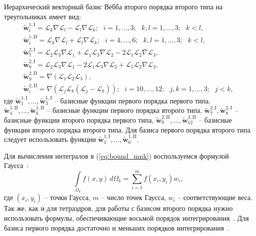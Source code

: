 \documentclass[a4paper,14pt]{article}
\begin{document}
Иерархический векторный базис Вебба второго порядка второго типа на треугольниках имеет вид:
\begin{equation*}
	\begin{matrix}
		\displaystyle
		\tilde{\mathbf{w}}_{i}^{1,\mathrm{I}} = \mathcal{L}_k \nabla \mathcal{L}_l - \mathcal{L}_l \nabla \mathcal{L}_k ;
		\scriptstyle
		\text{~~} i = 1, ..., 3 ; \text{~~} k, l = 1, ..., 3 ; \text{~~} k < l ,\\
		\displaystyle
		\tilde{\mathbf{w}}_{i}^{1,\mathrm{II}} = \mathcal{L}_k \nabla \mathcal{L}_l + \mathcal{L}_l \nabla \mathcal{L}_k ;
		\scriptstyle
		\text{~~} i = 4, ..., 6 ; \text{~~} k, l = 1, ..., 3 ; \text{~~} k < l ,\\
		\displaystyle
		\tilde{\mathbf{w}}_{7}^{2,\mathrm{I}} = \mathcal{L}_2 \mathcal{L}_3 \nabla \mathcal{L}_1 + \mathcal{L}_1 \mathcal{L}_3 \nabla \mathcal{L}_2 - 2 \mathcal{L}_1 \mathcal{L}_2 \nabla \mathcal{L}_3 ,\\
		\displaystyle
		\tilde{\mathbf{w}}_{8}^{2,\mathrm{I}} = \mathcal{L}_2 \mathcal{L}_3 \nabla \mathcal{L}_1 - 2 \mathcal{L}_1 \mathcal{L}_3 \nabla \mathcal{L}_2 + \mathcal{L}_1 \mathcal{L}_2 \nabla \mathcal{L}_3 ,\\
		\displaystyle
		\tilde{\mathbf{w}}_{9}^{2,\mathrm{II}} = \nabla ( \mathcal{L}_1 \mathcal{L}_2 \mathcal{L}_3 ) ,\\
		\displaystyle
		\tilde{\mathbf{w}}_{i}^{2,\mathrm{II}} = \nabla ( \mathcal{L}_j \mathcal{L}_k ( \mathcal{L}_j - \mathcal{L}_k ) ) ;
		\scriptstyle
		\text{~~} i = 10, ..., 12 ; \text{~~} j, k = 1, ..., 3 ; \text{~~} j < k ,
	\end{matrix}
	\label{eq:tr_basis}
\end{equation*}
где $\tilde{\mathbf{w}}_{1}^{1,\mathrm{I}}, ..., \tilde{\mathbf{w}}_{3}^{1,\mathrm{I}}$ -- базисные функции первого порядка первого типа, $\tilde{\mathbf{w}}_{4}^{1,\mathrm{II}}, ..., \tilde{\mathbf{w}}_{6}^{1,\mathrm{II}}$ -- базисные функции первого порядка второго типа, $\tilde{\mathbf{w}}_{7}^{2,\mathrm{I}}, \tilde{\mathbf{w}}_{8}^{2,\mathrm{I}}$ -- базисные функции второго порядка первого типа, $\tilde{\mathbf{w}}_{9}^{2,\mathrm{II}}, ..., \tilde{\mathbf{w}}_{12}^{2,\mathrm{II}}$ -- базисные функции второго порядка второго типа. Для базиса первого порядка второго типа следует использовать функции $\tilde{\mathbf{w}}_{1}^{1,\mathrm{I}}, ..., \tilde{\mathbf{w}}_{6}^{1,\mathrm{II}}$.

Для вычисления интегралов в (\ref{eq:bound_mnk}) воспользуемся формулой Гаусса~\citep{misovskih}:
\begin{equation*}
	\int\limits_{\Omega_k} f(x, y) \,d\Omega_k = \sum\limits_{i = 1}^m f( x_i , y_i) w_i ,
\end{equation*}
где $(x_i , y_i)$ -- точки Гаусса, $m$ -- число точек Гаусса, $w_i$ -- соответствующие веса. Так же, как и для тетраэдров, для работы с базисом второго порядка нужно использовать формулы, обеспечивающие восьмой порядок интегрирования~\citep{zhang_integration}. Для базиса первого порядка достаточно и меньших порядков интегрирования~\citep{tr_integration, misovskih}.
\end{document}

